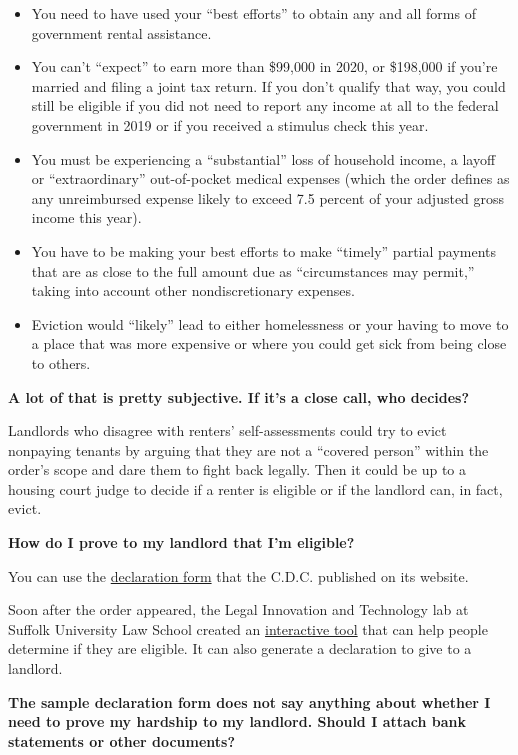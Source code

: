 \begin{itemize}
\item
  You need to have used your ``best efforts'' to obtain any and all
  forms of government rental assistance.
\item
  You can't ``expect'' to earn more than \$99,000 in 2020, or \$198,000
  if you're married and filing a joint tax return. If you don't qualify
  that way, you could still be eligible if you did not need to report
  any income at all to the federal government in 2019 or if you received
  a stimulus check this year.
\item
  You must be experiencing a ``substantial'' loss of household income, a
  layoff or ``extraordinary'' out-of-pocket medical expenses (which the
  order defines as any unreimbursed expense likely to exceed 7.5 percent
  of your adjusted gross income this year).
\item
  You have to be making your best efforts to make ``timely'' partial
  payments that are as close to the full amount due as ``circumstances
  may permit,'' taking into account other nondiscretionary expenses.
\item
  Eviction would ``likely'' lead to either homelessness or your having
  to move to a place that was more expensive or where you could get sick
  from being close to others.
\end{itemize}

\textbf{A lot of that is pretty subjective. If it's a close call, who
decides?}

Landlords who disagree with renters' self-assessments could try to evict
nonpaying tenants by arguing that they are not a ``covered person''
within the order's scope and dare them to fight back legally. Then it
could be up to a housing court judge to decide if a renter is eligible
or if the landlord can, in fact, evict.

\textbf{How do I prove to my landlord that I'm eligible?}

You can use the
\href{https://www.cdc.gov/coronavirus/2019-ncov/downloads/declaration-form.pdf}{declaration
form} that the C.D.C. published on its website.

Soon after the order appeared, the Legal Innovation and Technology lab
at Suffolk University Law School created an
\href{https://massaccess.suffolklitlab.org/housing/\#CDC}{interactive
tool} that can help people determine if they are eligible. It can also
generate a declaration to give to a landlord.

\textbf{The sample declaration form does not say anything about whether
I need to prove my hardship to my landlord. Should I attach bank
statements or other documents?}

